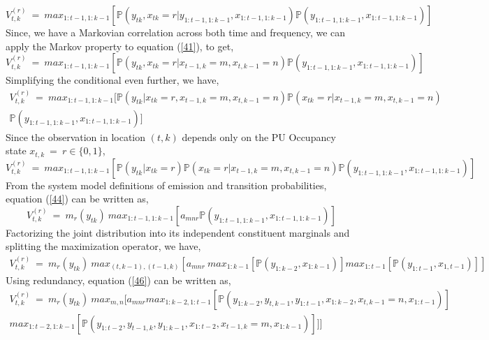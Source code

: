 \documentclass[12pt, draftcls, onecolumn]{IEEEtran}
\begin{document}
\begin{equation}\label{41}
    V_{t,k}^{(r)}\ =\ max_{1:t-1,1:k-1}[\mathbb P(y_{tk}, x_{tk}=r|y_{1:t-1,1:k-1}, x_{1:t-1,1:k-1})\mathbb P(y_{1:t-1,1:k-1}, x_{1:t-1,1:k-1})]
\end{equation}
Since, we have a Markovian correlation across both time and frequency, we can apply the Markov property to equation (\ref{41}), to get,
\begin{equation}\label{42}
         V_{t,k}^{(r)}\ =\ max_{1:t-1,1:k-1}[\mathbb P(y_{tk}, x_{tk}=r|x_{t-1,k}=m,x_{t,k-1}=n)\mathbb P(y_{1:t-1,1:k-1}, x_{1:t-1,1:k-1})]
\end{equation}
Simplifying the conditional even further, we have,
\begin{equation}\label{43}
\begin{aligned}
    V_{t,k}^{(r)}\ =\ max_{1:t-1,1:k-1}[\mathbb P(y_{tk}|x_{tk}=r,x_{t-1,k}=m,x_{t,k-1}=n)\mathbb P(x_{tk}=r|x_{t-1,k}=m,x_{t,k-1}=n)\\\mathbb P(y_{1:t-1,1:k-1}, x_{1:t-1,1:k-1})]
\end{aligned}
\end{equation}
Since the observation in location $(t,k)$ depends only on the PU Occupancy state $x_{t,k}\ =\ r \in \{0,1\}$,
\begin{equation}\label{44}
    V_{t,k}^{(r)}\ =\ max_{1:t-1,1:k-1}[\mathbb P(y_{tk}|x_{tk}=r)\mathbb P(x_{tk}=r|x_{t-1,k}=m,x_{t,k-1}=n)\mathbb P(y_{1:t-1,1:k-1}, x_{1:t-1,1:k-1})]
\end{equation}
From the system model definitions of emission and transition probabilities, equation (\ref{44}) can be written as,
\begin{equation}\label{45}
    V_{t,k}^{(r)}\ =\ m_r(y_{tk})\ max_{1:t-1,1:k-1}[a_{mnr}\mathbb P(y_{1:t-1,1:k-1}, x_{1:t-1,1:k-1})]
\end{equation}
Factorizing the joint distribution into its independent constituent marginals and splitting the maximization operator, we have,
\begin{equation}\label{46}
    \begin{aligned}
         V_{t,k}^{(r)}\ =\ m_r(y_{tk})\ max_{(t,k-1),(t-1,k)}[a_{mnr}\  max_{1:k-1}[\mathbb P(y_{1:k-2},x_{1:k-1})]max_{1:t-1}[\mathbb P(y_{1:t-1},x_{1,t-1})]]
    \end{aligned}
\end{equation}
Using redundancy, equation (\ref{46}) can be written as,
\begin{equation}\label{47}
    \begin{aligned}
         V_{t,k}^{(r)}\ =\ m_r(y_{tk})\ max_{m,n}[a_{mnr}max_{1:k-2,1:t-1}[\mathbb P(y_{1:k-2},y_{t,k-1},y_{1:t-1},x_{1:k-2},x_{t,k-1}=n,x_{1:t-1})]\\max_{1:t-2,1:k-1}[\mathbb P(y_{1:t-2},y_{t-1,k},y_{1:k-1},x_{1:t-2},x_{t-1,k}=m,x_{1:k-1})]]]
    \end{aligned}
\end{equation}
\end{document}
